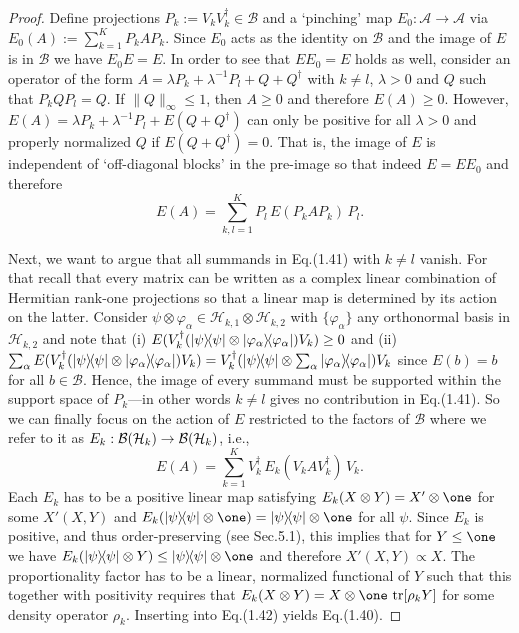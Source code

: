 \documentclass[11pt,a4paper]{article}
\theoremstyle{plain}
\theoremstyle{definition}
\theoremstyle{remark}
\numberwithin{equation}{section}
\begin{document}
\begin{proof}
    Define projections $P_k:=V_kV_k^\dagger\in \mathcal{B}$ and a `pinching' map $E_0:\mathcal{A}\to \mathcal{A}$ via $E_0(A):=\sum_{k=1}^{K} P_kAP_k$. Since $E_0$ acts as the identity on $\mathcal{B}$ and the image of $E$ is in $\mathcal{B}$ we have $E_0E=E$. In order to see that $EE_0=E$ holds as well, consider an operator of the form $A=\lambda P_k+\lambda^{-1}P_l+Q+Q^\dagger$ with $k\ne l$, $\lambda>0$ and $Q$ such that $P_kQP_l=Q$. If $\|Q\|_\infty\le 1$, then $A\ge 0$ and therefore $E(A)\ge 0$. However, $E(A)=\lambda P_k+\lambda^{-1}P_l+E(Q+Q^\dagger)$ can only be positive for all $\lambda>0$ and properly normalized $Q$ if $E(Q+Q^\dagger)=0$. That is, the image of $E$ is independent of `off-diagonal blocks' in the pre-image so that indeed $E=EE_0$ and therefore
    \begin{equation}
        E(A)=\sum_{k,l=1}^{K} P_l\,E\!(P_kAP_k)\,P_l.
    \end{equation}

    Next, we want to argue that all summands in Eq.(1.41) with $k\ne l$ vanish. For that recall that every matrix can be written as a complex linear combination of Hermitian rank-one projections so that a linear map is determined by its action on the latter. Consider $\psi\otimes \varphi_\alpha\in \mathcal{H}_{k,1}\otimes \mathcal{H}_{k,2}$ with $\{\varphi_\alpha\}$ any orthonormal basis in $\mathcal{H}_{k,2}$ and note that (i) $E(V_k^\dagger(|\psi\rangle\!\langle\psi|\otimes |\varphi_\alpha\rangle\!\langle\varphi_\alpha|)V_k)\ge 0$ and (ii) $\sum_\alpha E(V_k^\dagger(|\psi\rangle\!\langle\psi|\otimes |\varphi_\alpha\rangle\!\langle\varphi_\alpha|)V_k)=V_k^\dagger(|\psi\rangle\!\langle\psi|\otimes \sum_\alpha |\varphi_\alpha\rangle\!\langle\varphi_\alpha|)V_k$ since $E(b)=b$ for all $b\in \mathcal{B}$. Hence, the image of every summand must be supported within the support space of $P_k$---in other words $k\ne l$ gives no contribution in Eq.(1.41). So we can finally focus on the action of $E$ restricted to the factors of $\mathcal{B}$ where we refer to it as $E_k:\mathcal{B}(\mathcal{H}_k)\to \mathcal{B}(\mathcal{H}_k)$, i.e.,
    \begin{equation}
        E(A)=\sum_{k=1}^{K} V_k^\dagger\,E_k\!(V_kAV_k^\dagger)\,V_k.
    \end{equation}
    Each $E_k$ has to be a positive linear map satisfying $E_k(X\otimes Y)=X'\otimes \one$ for some $X'(X,Y)$ and $E_k(\ketbra{\psi}{\psi}\otimes \one)=\ketbra{\psi}{\psi}\otimes \one$ for all $\psi$. Since $E_k$ is positive, and thus order-preserving (see Sec.5.1), this implies that for $Y\le \one$ we have $E_k(\ketbra{\psi}{\psi}\otimes Y)\le \ketbra{\psi}{\psi}\otimes \one$ and therefore $X'(X,Y)\propto X$. The proportionality factor has to be a linear, normalized functional of $Y$ such that this together with positivity requires that $E_k(X\otimes Y)=X\otimes \one\,\tr[\rho_kY]$ for some density operator $\rho_k$. Inserting into Eq.(1.42) yields Eq.(1.40).
\end{proof}
\end{document}
